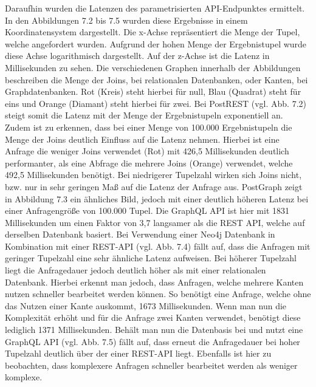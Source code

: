 \noindent
Daraufhin wurden die Latenzen des parametrisierten API-Endpunktes ermittelt. In den Abbildungen 7.2 bis 7.5 wurden diese Ergebnisse in einem Koordinatensystem dargestellt. Die x-Achse repräsentiert die Menge der Tupel, welche angefordert wurden. Aufgrund der hohen Menge der Ergebnistupel wurde diese Achse logarithmisch dargestellt. Auf der z-Achse ist die Latenz in Millisekunden zu sehen. Die verschiedenen Graphen innerhalb der Abbildungen beschreiben die Menge der Joins, bei relationalen Datenbanken, oder Kanten, bei Graphdatenbanken. Rot (Kreis) steht hierbei für null, Blau (Quadrat) steht für eins und Orange (Diamant) steht hierbei für zwei. 
\newline
Bei PostREST (vgl. Abb. 7.2) steigt somit die Latenz mit der Menge der Ergebnistupeln exponentiell an. Zudem ist zu erkennen, dass bei einer Menge von 100.000 Ergebnistupeln die Menge der Joins deutlich Einfluss auf die Latenz nehmen. Hierbei ist eine Anfrage die weniger Joins verwendet (Rot) mit 426,5 Millisekunden deutlich performanter, als eine Abfrage die mehrere Joins (Orange) verwendet, welche 492,5 Millisekunden benötigt. Bei niedrigerer Tupelzahl wirken sich Joins nicht, bzw. nur in sehr geringen Maß auf die Latenz der Anfrage aus.
\newline
PostGraph zeigt in Abbildung 7.3 ein ähnliches Bild, jedoch mit einer deutlich höheren Latenz bei einer Anfragengröße von 100.000 Tupel. Die GraphQL API ist hier mit 1831 Millisekunden um einen Faktor von 3,7 langsamer als die REST API, welche auf derselben Datenbank basiert.
\newline
Bei Verwendung einer Neo4j Datenbank in Kombination mit einer REST-API (vgl. Abb. 7.4) fällt auf, dass die Anfragen mit geringer Tupelzahl eine sehr ähnliche Latenz aufweisen. Bei höherer Tupelzahl liegt die Anfragedauer jedoch deutlich höher als mit einer relationalen Datenbank. Hierbei erkennt man jedoch, dass Anfragen, welche mehrere Kanten nutzen schneller bearbeitet werden können. So benötigt eine Anfrage, welche ohne das Nutzen einer Kante auskommt, 1673 Millisekunden. Wenn man nun die Komplexität erhöht und für die Anfrage zwei Kanten verwendet, benötigt diese lediglich 1371 Millisekunden.
 \newline
Behält man nun die Datenbasis bei und nutzt eine GraphQL API (vgl. Abb. 7.5) fällt auf, dass erneut die Anfragedauer bei hoher Tupelzahl deutlich über der einer REST-API liegt. Ebenfalls ist hier zu beobachten, dass komplexere Anfragen schneller bearbeitet werden als weniger komplexe.
\newline
